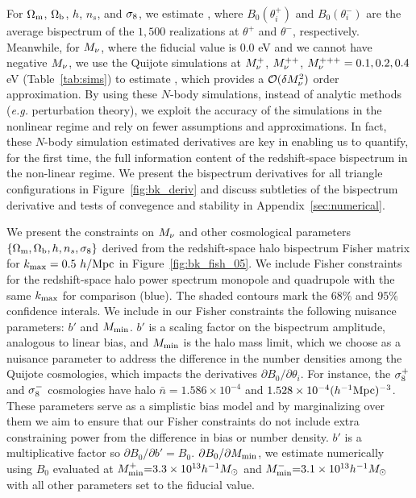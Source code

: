 For $\Omega_{\rm m}$, $\Omega_{\rm b}$, $h$, $n_s$, and $\sigma_8$, we estimate 
\beq \label{eq:dbkdt} 
 \approx {}, 
\eeq
where $B_0(\theta_i^{+})$ and $B_0(\theta_i^{-})$ are 
the average bispectrum of the $1,500$ realizations at $\theta^{+}$ and $\theta^{-}$, 
respectively. Meanwhile, for $M_\nu$, where the fiducial value is 0.0 eV and we 
cannot have negative $M_\nu$, we use the Quijote simulations at $M_\nu^+$, 
$M_\nu^{++}$, 
$M_\nu^{+++}=0.1, 0.2, 0.4$ eV (Table~\ref{tab:sims}) to estimate 
\beq \label{eq:dbkdmnu} 
 \approx {}, 
\eeq
which provides a $\mathcal{O}(\delta M_\nu^2)$ order approximation. By using these 
$N$-body simulations, instead of analytic methods (\emph{e.g.} perturbation theory), 
we exploit the accuracy of the simulations in the nonlinear regime and rely on fewer 
assumptions and approximations. In fact, these $N$-body simulation estimated 
derivatives are key in enabling us to quantify, for the first time, the full information 
content of the redshift-space bispectrum in the non-linear regime. We present the 
bispectrum derivatives for all triangle configurations in Figure~\ref{fig:bk_deriv} and  
discuss subtleties of the bispectrum derivative and tests of convegence and stability 
in Appendix~\ref{sec:numerical}. 

We present the constraints on $M_\nu$ and other cosmological parameters 
$\{\Omega_{\rm m}, \Omega_{\rm b}, h, n_s, \sigma_8\}$ derived from the redshift-space halo bispectrum 
Fisher matrix for $k_{\rm max} = 0.5~h/{\rm Mpc}$ in Figure~\ref{fig:bk_fish_05}. 
We include Fisher constraints for the redshift-space halo power spectrum 
monopole and quadrupole with the same $k_{\rm max}$ for comparison (blue). 
The shaded contours mark the $68\%$ and $95\%$ confidence interals. We include 
in our Fisher constraints the following nuisance parameters: $b'$ and $M_{\rm min}$. 
$b'$ is a scaling factor on the bispectrum amplitude, analogous to linear bias, 
and $M_{\rm min}$ is the halo mass limit, which we choose as a nuisance
parameter to address the difference in the number densities among the Quijote
cosmologies, which impacts the derivatives $\partial B_0/\partial \theta_i$. 
For instance, the $\sigma_8^{+}$ and $\sigma_8^{-}$ cosmologies have halo 
$\bar{n} = 1.586\times10^{-4}$ and $1.528 \times 10^{-4}(h^{-1}{\rm Mpc})^{-3}$. 
These parameters serve as a simplistic bias model and by marginalizing 
over them we aim to ensure that our Fisher constraints do not include extra 
constraining power from the difference in bias or number density. $b'$ is a 
multiplicative factor so $\partial B_0/\partial b' = B_0$. 
$\partial B_0/\partial M_{\rm min}$, we estimate numerically using 
$B_0$ evaluated at $M^{+}_{\rm min}{=}3.3\times10^{13}h^{-1}M_\odot$ 
and $M^{-}_{\rm min}{=}3.1\times10^{13}h^{-1}M_\odot$ with all other parameters 
set to the fiducial value. 

